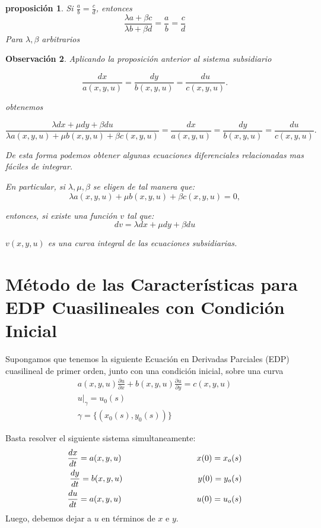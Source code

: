 \documentclass[11pt]{book}
\theoremstyle{plain}
\newtheorem{proposición}{proposición}[section]
\newtheorem{obs}[proposición]{Observación}
\theoremstyle{definition}
\begin{document}
\begin{proposición}
Si $\frac{a}{b} = \frac{c}{d}$, entonces
$$\frac{\lambda a + \beta c}{\lambda b + \beta d} = \frac{a}{b} = \frac{c}{d}$$
Para $\lambda, \beta$ arbitrarios
\end{proposición}

\begin{obs}
    Aplicando la proposición anterior al sistema subsidiario 
    
    $$\frac{dx}{a(x,y,u)} = \frac{dy}{b(x,y,u)} = \frac{du}{c(x,y,u)}.$$
    
    obtenemos
    
    $$\frac{\lambda dx + \mu dy + \beta du}{\lambda a(x,y,u) + \mu b(x,y,u) + \beta c(x,y,u)} =\frac{dx}{a(x,y,u)} = \frac{dy}{b(x,y,u)} = \frac{du}{c(x,y,u)}.$$

    De esta forma podemos obtener algunas ecuaciones diferenciales relacionadas mas fáciles de integrar.

    En particular, si $\lambda, \mu, \beta$ se eligen de tal manera que:
    $$\lambda a(x,y,u) + \mu b(x,y,u) + \beta c(x,y,u) = 0,$$

    entonces, si existe una función $v$ tal que:
    $$dv = \lambda dx + \mu dy + \beta du$$

    $v(x,y,u)$ es una curva integral de las ecuaciones subsidiarias.
\end{obs}

\newpage
\section{Método de las Características para EDP Cuasilineales con Condición Inicial}

Supongamos que tenemos la siguiente Ecuación en Derivadas Parciales (EDP) cuasilineal de primer orden, junto con una condición inicial, sobre una curva
\setcounter{equation}{0}
\begin{align}
    a(x, y, u) \frac{\partial u}{\partial x} + b(x, y, u) \frac{\partial u}{\partial y} = c(x, y, u)\\
    u|_{\gamma} = u_0(s)\\
    \gamma =\{(x_0(s),y_0(s))\}
\end{align}

Basta resolver el siguiente sistema simultaneamente:
\begin{align}
    \frac{dx}{dt} = a(x,y,u) \hspace{32mm} x(0) = x_o(s)\\
    \frac{dy}{dt} = b(x,y,u) \hspace{32mm} y(0) = y_o(s)\\
    \frac{du}{dt} = a(x,y,u) \hspace{32mm} u(0) = u_o(s)
\end{align}
Luego, debemos dejar a $u$ en términos de $x$ e $y$.
\end{document}

